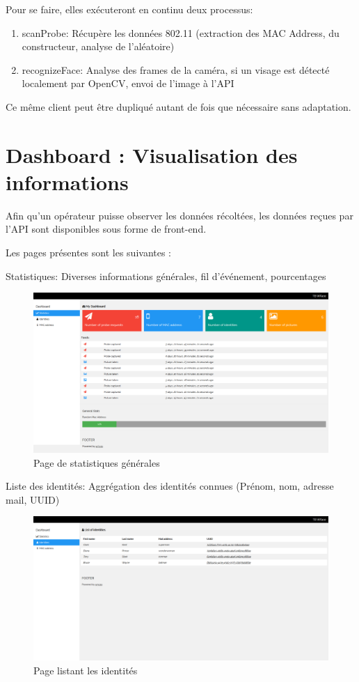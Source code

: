 Pour se faire, elles exécuteront en continu deux processus:
\begin{enumerate}
	\item scanProbe: Récupère les données 802.11 (extraction des MAC Address, du constructeur, analyse de l'aléatoire)
	\item recognizeFace: Analyse des frames de la caméra, si un visage est détecté localement par OpenCV, envoi de l'image à l'API
\end{enumerate}

Ce même client peut être dupliqué autant de fois que nécessaire sans adaptation. 

\section{Dashboard : Visualisation des informations}
Afin qu'un opérateur puisse observer les données récoltées, les données reçues par l'API sont disponibles sous forme de front-end.

Les pages présentes sont les suivantes : 

Statistiques: Diverses informations générales, fil d'événement, pourcentages
\begin{figure}[H]
	\centering
	\includegraphics[width=16cm]{images/dashboard/stats.png}
	\caption{Page de statistiques générales}
	\label{fig:dashboard_stats}
\end{figure}

Liste des identités: Aggrégation des identités connues (Prénom, nom, adresse mail, UUID)
\begin{figure}[H]
	\centering
	\includegraphics[width=16cm]{images/dashboard/list-identities.png}
	\caption{Page listant les identités}
	\label{fig:dashboard_list_identities}
\end{figure}

